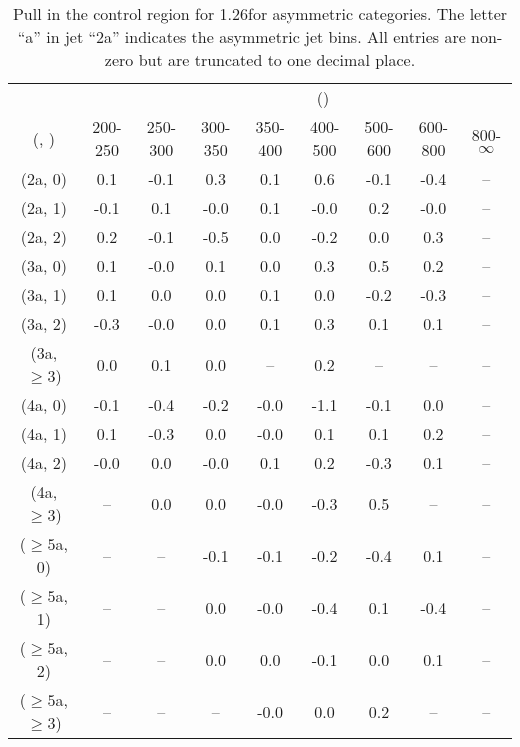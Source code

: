\begin{table}[h!]
\tiny
\centering
\caption{Pull in the \mj control region for 1.26\ifb for asymmetric categories. The letter ``a'' in jet \eg ``2a''  indicates the asymmetric jet bins. All entries are non-zero but are truncated to one decimal place.\label{tab:pullsep_mu_ewk_asym}}
\begin{tabular}
{ccccccccc}
	\hline\hline
&	& \multicolumn{8}{c}{\scalht (\gev)} \\ 
	 (\njet,  \nb) & 200-250 & 250-300 & 300-350 & 350-400 & 400-500 & 500-600 & 600-800 & 800-$\infty$ \\ [0.8ex] 
\hline
	(2a, 0) & 0.1 & -0.1 & 0.3 & 0.1 & 0.6 & -0.1 & -0.4 & -- \\[0.5ex] 
	(2a, 1) & -0.1 & 0.1 & -0.0 & 0.1 & -0.0 & 0.2 & -0.0 & -- \\[0.5ex] 
	(2a, 2) & 0.2 & -0.1 & -0.5 & 0.0 & -0.2 & 0.0 & 0.3 & -- \\[0.5ex] 
	(3a, 0) & 0.1 & -0.0 & 0.1 & 0.0 & 0.3 & 0.5 & 0.2 & -- \\[0.5ex] 
	(3a, 1) & 0.1 & 0.0 & 0.0 & 0.1 & 0.0 & -0.2 & -0.3 & -- \\[0.5ex] 
	(3a, 2) & -0.3 & -0.0 & 0.0 & 0.1 & 0.3 & 0.1 & 0.1 & -- \\[0.5ex] 
	(3a, $\ge3$) & 0.0 & 0.1 & 0.0 & -- & 0.2 & -- & -- & -- \\[0.5ex] 
	(4a, 0) & -0.1 & -0.4 & -0.2 & -0.0 & -1.1 & -0.1 & 0.0 & -- \\[0.5ex] 
	(4a, 1) & 0.1 & -0.3 & 0.0 & -0.0 & 0.1 & 0.1 & 0.2 & -- \\[0.5ex] 
	(4a, 2) & -0.0 & 0.0 & -0.0 & 0.1 & 0.2 & -0.3 & 0.1 & -- \\[0.5ex] 
	(4a, $\ge3$) & -- & 0.0 & 0.0 & -0.0 & -0.3 & 0.5 & -- & -- \\[0.5ex] 
	($\ge5$a, 0) & -- & -- & -0.1 & -0.1 & -0.2 & -0.4 & 0.1 & -- \\[0.5ex] 
	($\ge5$a, 1) & -- & -- & 0.0 & -0.0 & -0.4 & 0.1 & -0.4 & -- \\[0.5ex] 
	($\ge5$a, 2) & -- & -- & 0.0 & 0.0 & -0.1 & 0.0 & 0.1 & -- \\[0.5ex] 
	($\ge5$a, $\ge3$) & -- & -- & -- & -0.0 & 0.0 & 0.2 & -- & -- \\[0.5ex] 
	\hline
	\hline
\end{tabular}
\end{table}
